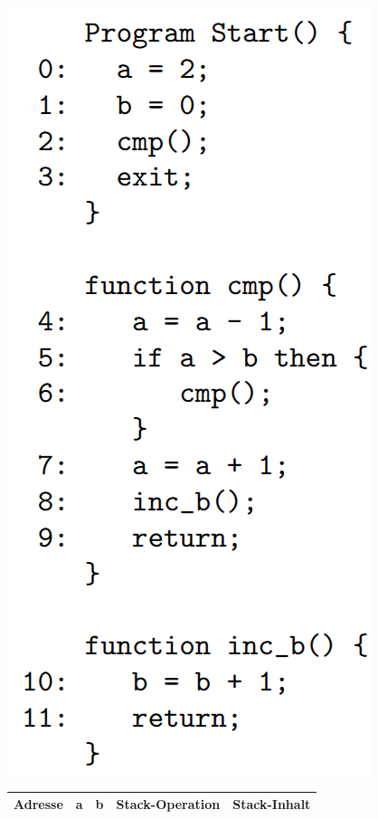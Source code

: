 \documentclass[a4paper, 12pt, margins=2cm]{homework}
\begin{document}
  \begin{problem}
  \end{problem}
  \begin{solution} \hfill
    
    \begin{minipage}{0.5\textwidth}
      \includegraphics[scale=0.35]{3.png}
    \end{minipage}
    \begin{minipage}{0.5\textwidth}
      \begin{tabular}{|c|c|c|c|c|}
      \hline
        Adresse & a & b & Stack-Operation & Stack-Inhalt \\ \hline \hline

\end{tabular}
\end{minipage}
\end{solution}
\end{document}
